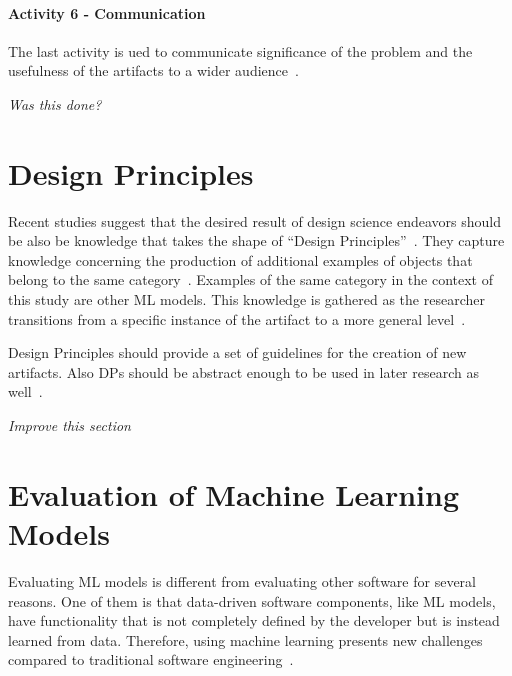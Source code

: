 \paragraph{Activity 6 - Communication}
The last activity is ued to communicate significance of the problem and the usefulness of the artifacts to a wider
audience~\cite[p. 56]{peffers_designscienceresearch_2007}.

\textit{Was this done?}


\section{Design Principles}\label{sec:design-principles}


Recent studies suggest that the desired result of design science endeavors should be also be knowledge that takes the
shape of
``Design Principles''~\cite{baskerville2010explanatory, sein2011action, gregor_positioningpresentingdesign_2013}.
They capture knowledge concerning the production of additional examples of objects that belong to the same
category~\cite[p. 39]{sein2011action}.
Examples of the same category in the context of this study are other \ac{ML} models.
This knowledge is gathered as the researcher transitions from a specific instance of the
artifact to a more general level~\cite[p. 37]{chandra2016making}.

Design Principles should provide a set of guidelines for the creation of new artifacts.
Also DPs should be abstract enough to be used in later research as well~\cite[p. 37]{sein2011action}.

\textit{Improve this section}


\section{Evaluation of Machine Learning Models}\label{sec:evaluation-of-machine-learning-models}
Evaluating \ac{ML} models is different from evaluating other software for several reasons.
One of them is that data-driven software components, like \ac{ML} models, have functionality that
is not completely defined by the developer but is instead learned from data.
Therefore, using machine learning presents new challenges compared to traditional software
engineering~\cite[p. 2]{siebert2022construction}.

